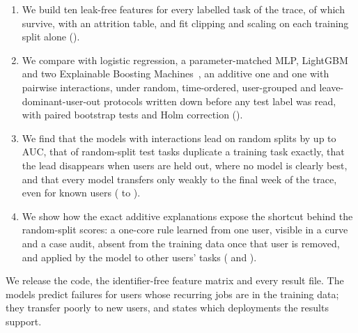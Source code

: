 \begin{enumerate}
\item We build ten leak-free features for every labelled task of the trace,  of which survive, with an attrition table, and fit clipping and scaling on each training split alone ().
\item We compare \kaam{} with logistic regression, a parameter-matched MLP, LightGBM~\cite{ke2017lightgbm} and two Explainable Boosting Machines~\cite{nori2019interpretml}, an additive one and one with pairwise interactions, under random, time-ordered, user-grouped and leave-dominant-user-out protocols written down before any test label was read, with paired bootstrap tests and Holm correction ().
\item We find that the models with interactions lead on random splits by up to  AUC, that  of random-split test tasks duplicate a training task exactly, that the lead disappears when users are held out, where no model is clearly best, and that every model transfers only weakly to the final week of the trace, even for known users ( to ).
\item We show how the exact additive explanations expose the shortcut behind the random-split scores: a one-core rule learned from one user, visible in a curve and a case audit, absent from the training data once that user is removed, and applied by the model to other users' tasks ( and ).
\end{enumerate}

We release the code, the identifier-free feature matrix and every result file. The models predict failures for users whose recurring jobs are in the training data; they transfer poorly to new users, and  states which deployments the results support.
